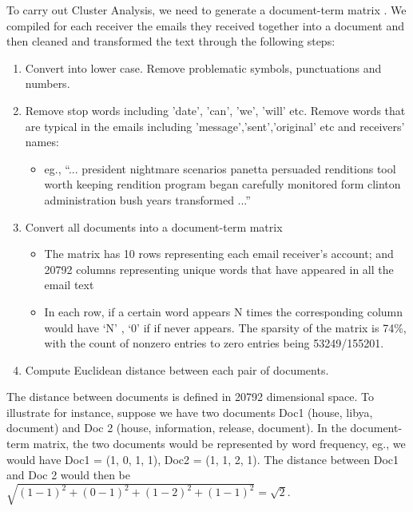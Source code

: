 To carry out Cluster Analysis, we need to generate a document-term matrix \cite{document-term2015}. 
We compiled for each receiver the emails they received together into a document and then cleaned and transformed the text through the following steps:
\begin{enumerate}
\item Convert into lower case. Remove problematic symbols, punctuations and numbers.
\item Remove stop words including 'date', 'can', 'we', 'will' etc. Remove words that are typical in the emails including 'message','sent','original' etc and receivers' names:
\begin{itemize}
\item eg., ``... president nightmare scenarios panetta persuaded renditions tool worth keeping rendition program began carefully monitored form clinton administration bush years transformed ...''
\end{itemize}
\item Convert all documents into a document-term matrix
\begin{itemize} 
\item The matrix has 10 rows representing each email receiver's account; and 20792 columns representing unique words that have appeared in all the email text
\item In each row, if a certain word appears N times the corresponding column would have `N' , `0' if if never appears. The sparsity of the matrix is 74\%, with the count of nonzero entries to zero entries being 53249/155201. 
\end{itemize}
\item Compute Euclidean distance between each pair of documents.
\end{enumerate}
The distance between documents is defined in 20792 dimensional space. To illustrate for instance, suppose we have two documents Doc1 (house, libya, document) and Doc 2 (house, information, release, document). In the document-term matrix, the two documents would be represented by word frequency, eg., we would have Doc1 = (1, 0, 1, 1), Doc2 = (1, 1, 2, 1). The distance between Doc1 and Doc 2 would then be $\sqrt{(1-1)^{2} + (0-1)^{2} + (1-2)^{2} + (1-1)^{2}} = \sqrt{2}$.

